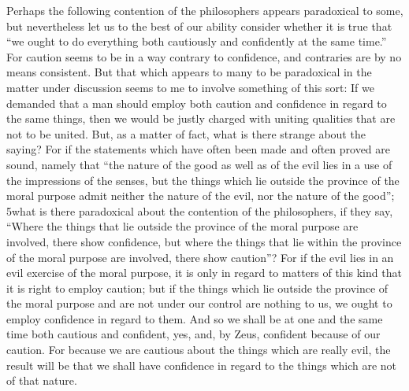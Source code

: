 Perhaps the following contention of the philosophers appears paradoxical to some, but nevertheless let us to the best of our ability consider whether it is true that ``we ought to do everything both cautiously and confidently at the same time.'' For caution seems to be in a way contrary to confidence, and contraries are by no means consistent. But that which appears to many to be paradoxical in the matter under discussion seems to me to involve something of this sort: If we demanded that a man should employ both caution and confidence in regard to the same things, then we would be justly charged with uniting qualities that are not to be united. But, as a matter of fact, what is there strange about the saying? For if the statements which have often been made and often proved are sound, namely that ``the nature of the good as well as of the evil lies in a use of the impressions of the senses, but the things which lie outside the province of the moral purpose admit neither the nature of the evil, nor the nature of the good''; 5what is there paradoxical about the contention of the philosophers, if they say, ``Where the things that lie outside the province of the moral purpose are involved, there show confidence, but where the things that lie within the province of the moral purpose are involved, there show caution''? For if the evil lies in an evil exercise of the moral purpose, it is only in regard to matters of this kind that it is right to employ caution; but if the things which lie outside the province of the moral purpose and are not under our control are nothing to us, we ought to employ confidence in regard to them. And so we shall be at one and the same time both cautious and confident, yes, and, by Zeus, confident because of our caution. For because we are cautious about the things which are really evil, the result will be that we shall have confidence in regard to the things which are not of that nature.

